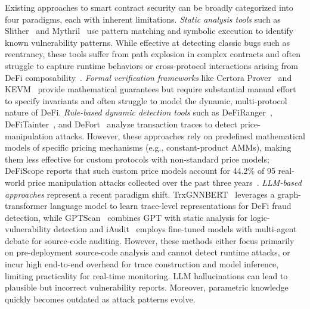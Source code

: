 Existing approaches to smart contract security can be broadly categorized into four paradigms, each with inherent limitations. \textit{Static analysis tools} such as Slither~\cite{slither} and Mythril~\cite{mythril2018} use pattern matching and symbolic execution to identify known vulnerability patterns. While effective at detecting classic bugs such as reentrancy, these tools suffer from path explosion in complex contracts and often struggle to capture runtime behaviors or cross-protocol interactions arising from DeFi composability~\cite{defi2023}. \textit{Formal verification frameworks} like Certora Prover~\cite{certoraProver} and KEVM~\cite{Hildenbrandt2018KEVM} provide mathematical guarantees but require substantial manual effort to specify invariants and often struggle to model the dynamic, multi-protocol nature of DeFi. \textit{Rule-based dynamic detection tools} such as DeFiRanger~\cite{defiranger2021}, DeFiTainter~\cite{defitainter2023}, and DeFort~\cite{defort2024} analyze transaction traces to detect price-manipulation attacks. However, these approaches rely on predefined mathematical models of specific pricing mechanisms (e.g., constant-product AMMs), making them less effective for custom protocols with non-standard price models; DeFiScope reports that such custom price models account for 44.2\% of 95 real-world price manipulation attacks collected over the past three years~\cite{zhong2025detectingvariousdefiprice}. \textit{LLM-based approaches} represent a recent paradigm shift. TrxGNNBERT~\cite{TrxGNNBERT} leverages a graph-transformer language model to learn trace-level representations for DeFi fraud detection, while GPTScan~\cite{GPTScan} combines GPT with static analysis for logic-vulnerability detection and iAudit~\cite{iaudit2025} employs fine-tuned models with multi-agent debate for source-code auditing. However, these methods either focus primarily on pre-deployment source-code analysis and cannot detect runtime attacks, or incur high end-to-end overhead for trace construction and model inference, limiting practicality for real-time monitoring. 
LLM hallucinations can lead to plausible but incorrect vulnerability reports.
Moreover, parametric knowledge quickly becomes outdated as attack patterns evolve.

